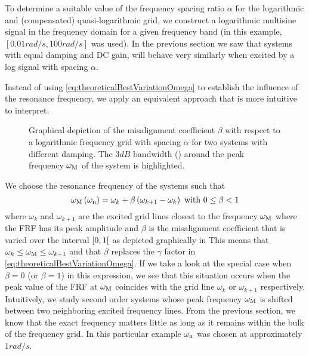   To determine a suitable value of the frequency spacing ratio $\alpha$ for the logarithmic and (compensated) quasi-logarithmic grid, we construct a logarithmic multisine signal in the frequency domain for a given frequency band (in this example, $\left[ 0.01 \unit{rad/s}, 100 \unit{rad/s}\right]$ was used).
  In the previous section we saw that systems with equal damping and DC gain, will behave very similarly when excited by a log signal with spacing $\alpha$.

  Instead of using \eqref{eq:theoreticalBestVariationOmega} to establish the influence of the resonance frequency, we apply an equivalent approach that is more intuitive to interpret.


  \begin{figure}
    \centering
      \setlength{}
      \setlength\figureheight{0.5\figurewidth}
    
    \caption[Depiction of the grid misalignment $\beta$ for a logarithmic generalized multisine.]{Graphical depiction of the misalignment coefficient $\beta$ with respect to a logarithmic frequency grid with spacing $\alpha$ for two systems with different damping.
    The $3\unit{dB}$ bandwidth (\sysBW) around the peak frequency $\omega_{\mathrm{M}}$ of the system is highlighted.}
    \label{fig:misalignment-logms}
  \end{figure}


  We choose the resonance frequency of the systems such that
  \begin{equation}
   \omega_{\mathrm{M}}\left( \omega_{\mathrm{n}} \right)  = \omega_k + \beta \left( \omega_{k+1} - \omega_k \right)
   \text{ with } 0 \leq \beta < 1
   \label{eq:chosenVariationOmega}
  \end{equation}
  where $\omega_k$ and $\omega_{k+1}$ are the excited grid lines closest to the frequency $\omega_{\mathrm{M}}$ where the FRF has its peak amplitude and $\beta$ is the misalignment coefficient that is varied over the interval $\left[ 0,1 \right[$ as depicted graphically in 
  This means that $\omega_k \leq \omega_{\mathrm{M}} \leq \omega_{k+1}$ and that $\beta$ replaces the $\gamma$ factor in \eqref{eq:theoreticalBestVariationOmega}.
  If we take a look at the special case when $\beta=0$ (or $\beta=1$) in this expression, we see that this situation occurs when the peak value of the FRF at $\omega_{\mathrm{M}}$ coincides with the grid line $\omega_k$ or $\omega_{k+1}$ respectively.
  Intuitively, we study second order systems whose peak frequency $\omega_{\mathrm{M}}$ is shifted between two neighboring excited frequency lines.
  From the previous section, we know that the exact frequency matters little as long as it remains within the bulk of the frequency grid.
  In this particular example $\omega_{\mathrm{n}}$ was chosen at approximately $1 \unit{rad/s}$.

